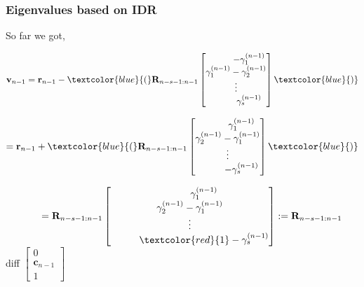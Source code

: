\documentclass[mathserif]{beamer}
\begin{document}
\begin{frame}
\frametitle{Eigenvalues based on IDR}
So far we got, 

$\mathbf{v}_{n-1}= \mathbf{r}_{n-1} -\textcolor{blue}{(}  \mathbf{R}_{n-s-1:n-1} \begin{bmatrix}
\hspace{.4in} -\gamma_1^{(n-1)}    \\ 
  \gamma_1^{(n-1)}- \gamma_2^{(n-1)} \\
 \vdots \\
\hspace{.4in}\gamma_s^{(n-1)} 

     \end{bmatrix}\textcolor{blue}{)}$

\vspace{.1in}
\hspace{.3in} $= \mathbf{r}_{n-1} +\textcolor{blue}{(}  \mathbf{R}_{n-s-1:n-1} \begin{bmatrix}
\hspace{.4in} \gamma_1^{(n-1)}    \\ 
  \gamma_2^{(n-1)}- \gamma_1^{(n-1)} \\
 \vdots \\
\hspace{.4in} - \gamma_s^{(n-1)} 

     \end{bmatrix}\textcolor{blue}{)}$

\pause
\vspace{.1in}
\hspace{.5in} $\hspace{.5in}  =\mathbf{R}_{n-s-1:n-1} \begin{bmatrix}
\hspace{.4in} \gamma_1^{(n-1)}    \\ 
  \gamma_2^{(n-1)}- \gamma_1^{(n-1)} \\
 \vdots \\
\hspace{.4in} \textcolor{red}{1}- \gamma_s^{(n-1)} 

     \end{bmatrix} := \mathbf{R}_{n-s-1:n-1}$  diff $\begin{bmatrix}
        0   \\ 
  \mathbf{c}_{n-1} \\
        1
\end{bmatrix}$
\end{frame}
\end{document}
